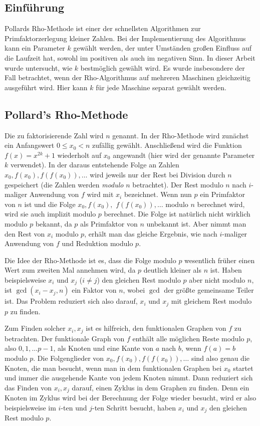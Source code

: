 \documentclass[a4paper, extrafontsizes, ngerman, 25pt]{memoir}
\begin{document}
\subsection{Einführung}

Pollards Rho-Methode ist einer der schnellsten Algorithmen zur Primfaktorzerlegung kleiner Zahlen. Bei der Implementierung des Algorithmus kann ein Parameter $k$ gewählt werden, der unter Umständen großen Einfluss auf die Laufzeit hat, sowohl im positiven als auch im negativen Sinn. In dieser Arbeit wurde untersucht, wie $k$ bestmöglich gewählt wird. Es wurde insbesondere der Fall betrachtet, wenn der Rho-Algorithmus auf mehreren Maschinen gleichzeitig ausgeführt wird. Hier kann $k$ für jede Maschine separat gewählt werden.

\newpage

\subsection{Pollard's Rho-Methode}

Die zu faktorisierende Zahl wird $n$ genannt. In der Rho-Methode wird zunächst ein Anfangswert $0 \le x_0 < n$ zufällig gewählt. Anschließend wird die Funktion $f(x) = x^{2k} + 1$ wiederholt auf $x_0$ angewandt (hier wird der genannte Parameter $k$ verwendet). In der daraus entstehende Folge an Zahlen $x_0, f(x_0), f(f(x_0)), \dots$ wird jeweils nur der Rest bei Division durch $n$ gespeichert (die Zahlen werden \emph{modulo} $n$ betrachtet). Der Rest modulo $n$ nach $i$-maliger Anwendung von $f$ wird mit $x_i$ bezeichnet. Wenn nun $p$ ein Primfaktor von $n$ ist und die Folge $x_0, f(x_0),$ $f(f(x_0)), \dots$ modulo $n$ berechnet wird, wird sie auch implizit modulo $p$ berechnet. Die Folge ist natürlich nicht wirklich modulo $p$ bekannt, da $p$ als Primfaktor von $n$ unbekannt ist. Aber nimmt man den Rest von $x_i$ modulo $p$, erhält man das gleiche Ergebnis, wie nach $i$-maliger Anwendung von $f$ und Reduktion modulo $p$.

Die Idee der Rho-Methode ist es, dass die Folge modulo $p$ wesentlich früher einen Wert zum zweiten Mal annehmen wird, da $p$ deutlich kleiner als $n$ ist. Haben beispielsweise $x_i$ und $x_j$ ($i \ne j$) den gleichen Rest modulo $p$ aber nicht modulo $n$, ist $\gcd(x_i - x_j, n)$ ein Faktor von $n$, wobei $\gcd$ der größte gemeinsame Teiler ist. Das Problem reduziert sich also darauf, $x_i$ und $x_j$ mit gleichem Rest modulo $p$ zu finden.

Zum Finden solcher $x_i, x_j$ ist es hilfreich, den funktionalen Graphen von $f$ zu betrachten. Der funktionale Graph von $f$ enthält alle möglichen Reste modulo $p$, also $0, 1, \dots p - 1$, als Knoten und eine Kante von $a$ nach $b$, wenn $f(a) = b$ modulo $p$. Die Folgenglieder von $x_0, f(x_0), f(f(x_0)), \dots$ sind also genau die Knoten, die man besucht, wenn man in dem funktionalen Graphen bei $x_0$ startet und immer die ausgehende Kante von jedem Knoten nimmt. Dann reduziert sich das Finden von $x_i, x_j$ darauf, einen Zyklus in dem Graphen zu finden. Denn ein Knoten im Zyklus wird bei der Berechnung der Folge wieder besucht, wird er also beispielsweise im $i$-ten und $j$-ten Schritt besucht, haben $x_i$ und $x_j$ den gleichen Rest modulo $p$.
\end{document}
